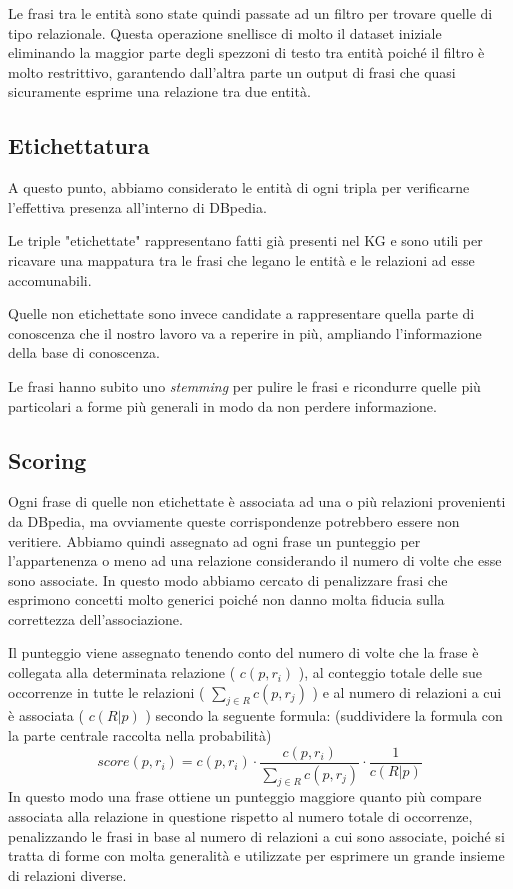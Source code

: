 \documentclass[10pt,a4paper,twocolumn]{article}
\begin{document}
Le frasi tra le entità sono state quindi passate ad un filtro per trovare quelle di tipo relazionale. Questa operazione snellisce di molto il dataset iniziale eliminando la maggior parte degli spezzoni di testo tra entità poiché il filtro è molto restrittivo, garantendo dall'altra parte un output di frasi che quasi sicuramente esprime una relazione tra due entità.

\subsection{Etichettatura}
A questo punto, abbiamo considerato le entità di ogni tripla per verificarne l'effettiva presenza all'interno di DBpedia.

Le triple "etichettate" rappresentano fatti già presenti nel KG e sono utili per ricavare una mappatura tra le frasi che legano le entità e le relazioni ad esse accomunabili.

Quelle non etichettate sono invece candidate a rappresentare quella parte di conoscenza che il nostro lavoro va a reperire in più, ampliando l'informazione della base di conoscenza.

Le frasi hanno subito uno \textit{stemming} per pulire le frasi e ricondurre quelle più particolari a forme più generali in modo da non perdere informazione.

\subsection{Scoring}

Ogni frase di quelle non etichettate è associata ad una o più relazioni provenienti da DBpedia, ma ovviamente queste corrispondenze potrebbero essere non veritiere. Abbiamo quindi assegnato ad ogni frase un punteggio per l'appartenenza o meno ad una relazione considerando il numero di volte che esse sono associate. In questo modo abbiamo cercato di penalizzare frasi che esprimono concetti molto generici poiché non danno molta fiducia sulla correttezza dell'associazione.

Il punteggio viene assegnato tenendo conto del numero di volte che la frase è collegata alla determinata relazione ( $c(p,r_i)$ ), al conteggio totale delle sue occorrenze in tutte le relazioni ( $\sum_{j \in R} c(p,r_j)$ ) e al numero di relazioni a cui è associata ( $c(R|p)$ ) secondo la seguente formula: (suddividere la formula con la parte centrale raccolta nella probabilità)
\[score(p,r_i)=c(p,r_i)\cdot\frac{c(p,r_i)}{\sum_{j \in R}c(p,r_j)}\cdot \frac{1}{c(R|p)} \]
In questo modo una frase ottiene un punteggio maggiore quanto più compare associata alla relazione in questione rispetto al numero totale di occorrenze, penalizzando le frasi in base al numero di relazioni a cui sono associate, poiché si tratta di forme con molta generalità e utilizzate per esprimere un grande insieme di relazioni diverse. 
\end{document}
